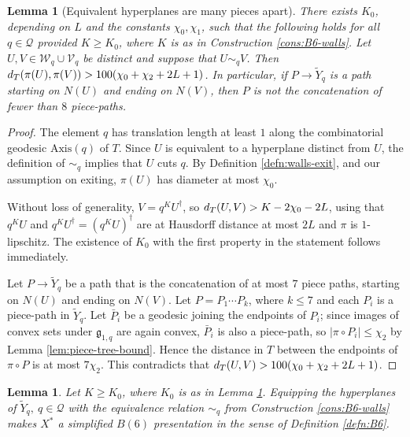 \documentclass[11pt,oneside]{amsart}
\newcounter{ax}
\newtheorem{lem}[thm]{Lemma}
\theoremstyle{definition}
\newcommand{\dist}{\textup{\textsf{d}}}
\newcommand{\gate}{\mathfrak g}
\newcommand{\axis}{\mathrm{Axis}}
\begin{document}
\begin{lem}[Equivalent hyperplanes are many pieces apart]\label{lem:K-large}
There exists $K_0$, depending on $L$ and the constants $\chi_0,\chi_1$, such that the following holds for all $q\in\mathcal Q$ provided $K\geq K_0$, where $K$ is as in Construction \ref{cons:B6-walls}.  Let $U,V\in\mathcal W_q\cup\mathcal V_q$ be distinct and suppose that $U\sim_qV$.  Then $\dist_T(\pi(U),\pi(V))>100(\chi_0+\chi_2+2L+1)$.  In particular, if $P\to\widetilde Y_q$ is a path starting on $N(U)$ and ending on $N(V)$, then $P$ is not the concatenation of fewer than $8$ piece-paths.
\end{lem}

\begin{proof}
The element $q$ has translation length at least $1$ along the combinatorial geodesic $\axis(q)$ of $T$.  Since $U$ is equivalent to a hyperplane distinct from $U$, the definition of $\sim_q$ implies that $U$ cuts $q$.  By Definition \ref{defn:walls-exit}, and our assumption on exiting, $\pi(U)$ has diameter at most $\chi_0$.

Without loss of generality, $V=q^KU^\dagger$, so $\dist_T(U,V)>K-2\chi_0-2L$, using that $q^KU$ and $q^KU^\dagger=(q^KU)^\dagger$ are at Hausdorff distance at most $2L$ and $\pi$ is $1$-lipschitz.  The existence of $K_0$ with the first property in the statement follows immediately.  

Let $P\to\widetilde Y_q$ be a path that is the concatenation of at most $7$ piece paths, starting on $N(U)$ and ending on $N(V)$.  Let $P=P_1\cdots P_k$, where $k\leq 7$ and each $P_i$ is a piece-path in $\widetilde Y_q$.  Let $\bar P_i$ be a geodesic joining the endpoints of $P_i$; since images of convex sets under $\gate_{1,q}$ are again convex, $\bar P_i$ is also a piece-path, so $|\pi\circ P_i|\leq \chi_2$ by Lemma \ref{lem:piece-tree-bound}.  Hence the distance in $T$ between the endpoints of $\pi\circ P$ is at most $7\chi_2$.  This contradicts that $\dist_T(U,V)>100(\chi_0+\chi_2+2L+1)$.
\end{proof}



\begin{lem}\label{lem:b6-check}
Let $K\geq K_0$, where $K_0$ is as in Lemma \ref{lem:K-large}.  Equipping the hyperplanes of $\widetilde Y_q,\ q\in\mathcal Q$ with the equivalence relation $\sim_q$ from Construction \ref{cons:B6-walls} makes $X^*$ a simplified $B(6)$ presentation in the sense of Definition \ref{defn:B6}.
\end{lem}
\end{document}
